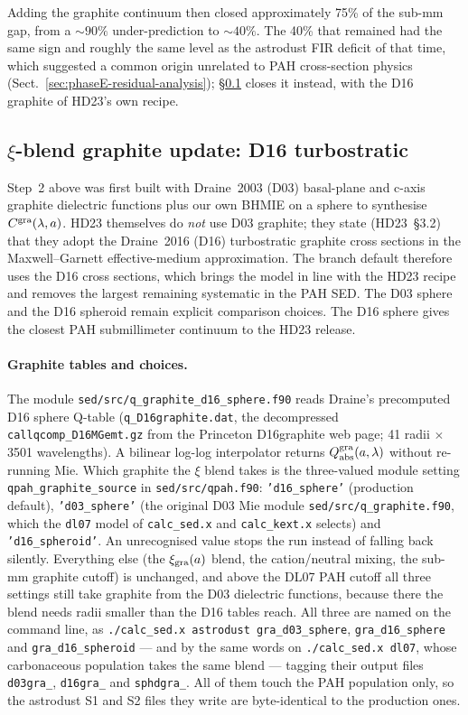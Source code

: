 \documentclass{my_memo}
\begin{document}
\medskip
Adding the graphite continuum then closed approximately 75\% of the
sub-mm gap, from a $\sim 90\%$ under-prediction to $\sim 40\%$. The
40\% that remained had the same sign and roughly the same level as the
astrodust FIR deficit of that time, which suggested a common origin
unrelated to PAH cross-section physics
(Sect.~\ref{sec:phaseE-residual-analysis}); \S\ref{sec:d16-swap}
closes it instead, with the D16 graphite of HD23's own recipe.

\subsection{$\xi$-blend graphite update: D16 turbostratic}
\label{sec:d16-swap}

Step~2 above was first built with Draine~2003 (D03) basal-plane and
c-axis graphite dielectric functions plus our own BHMIE on a sphere to
synthesise $C^{\rm gra}(\lambda, a)$. HD23 themselves do \emph{not} use
D03 graphite; they state (HD23~\S3.2) that they adopt the Draine~2016
(D16) turbostratic graphite cross sections in the Maxwell--Garnett
effective-medium approximation. The branch default therefore uses the
D16 cross sections, which brings the model in line with the HD23 recipe
and removes the largest remaining systematic in the PAH SED. The D03
sphere and the D16 spheroid remain explicit comparison choices. The
D16 sphere gives the closest PAH submillimeter continuum to the HD23
release.

\paragraph{Graphite tables and choices.} The module
\texttt{sed/src/q\_graphite\_d16\_sphere.f90} reads Draine's
precomputed D16 sphere Q-table (\texttt{q\_D16graphite.dat}, the
decompressed \texttt{callqcomp\_D16MGemt.gz} from the Princeton
D16graphite web page; 41 radii $\times$ 3501 wavelengths). A bilinear
log-log interpolator returns $Q_{\rm abs}^{\rm gra}(a, \lambda)$
without re-running Mie. Which graphite the $\xi$ blend takes is the
three-valued module setting \texttt{qpah\_graphite\_source} in
\texttt{sed/src/qpah.f90}: \texttt{'d16\_sphere'} (production default),
\texttt{'d03\_sphere'} (the original D03 Mie module
\texttt{sed/src/q\_graphite.f90}, which the \texttt{dl07} model of
\texttt{calc\_sed.x} and \texttt{calc\_kext.x} selects) and
\texttt{'d16\_spheroid'}. An
unrecognised value stops the run instead of falling back silently.
Everything else (the $\xi_{\rm gra}(a)$ blend, the cation/neutral
mixing, the sub-mm graphite cutoff) is unchanged, and above the DL07
PAH cutoff all three settings still take graphite from the D03
dielectric functions, because there the blend needs radii smaller than
the D16 tables reach. All three are named on the command line, as
\texttt{./calc\_sed.x astrodust gra\_d03\_sphere},
\texttt{gra\_d16\_sphere} and \texttt{gra\_d16\_spheroid} --- and by the same
words on \texttt{./calc\_sed.x dl07}, whose carbonaceous population takes the same
blend --- tagging their output files \texttt{d03gra\_}, \texttt{d16gra\_} and
\texttt{sphdgra\_}. All of them touch the PAH population only, so the astrodust
S1 and S2 files they write are byte-identical to the production ones.
\end{document}
